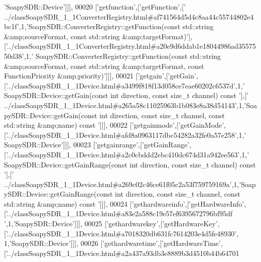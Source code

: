 \begin{DoxyCode}
{      'SoapySDR::Device'}]]],
00020   [\textcolor{stringliteral}{'getfunction'},[\textcolor{stringliteral}{'getFunction'},[\textcolor{stringliteral}{'
      ../classSoapySDR\_1\_1ConverterRegistry.html#af741564d5d4c8aa44c55744802e4bc1f'},1,\textcolor{stringliteral}{'SoapySDR::ConverterRegistry::getFunction(const std::string &amp;sourceFormat, const std::string
       &amp;targetFormat)'}],[\textcolor{stringliteral}{'../classSoapySDR\_1\_1ConverterRegistry.html#a20e9d6ddab1e18044986ad3557550d38'},1,\textcolor{stringliteral}{'
      SoapySDR::ConverterRegistry::getFunction(const std::string &amp;sourceFormat, const std::string &amp;targetFormat,
       const FunctionPriority &amp;priority)'}]]],
00021   [\textcolor{stringliteral}{'getgain'},[\textcolor{stringliteral}{'getGain'},[\textcolor{stringliteral}{'../classSoapySDR\_1\_1Device.html#a3499f818f13d058ce7eae60202c6537d'},1,\textcolor{stringliteral}{'
      SoapySDR::Device::getGain(const int direction, const size\_t channel) const '}],[\textcolor{stringliteral}{'
      ../classSoapySDR\_1\_1Device.html#a265a58c11025963b1b083e8a38d54143'},1,\textcolor{stringliteral}{'SoapySDR::Device::getGain(const int direction, const size\_t channel, const
       std::string &amp;name) const '}]]],
00022   [\textcolor{stringliteral}{'getgainmode'},[\textcolor{stringliteral}{'getGainMode'},[\textcolor{stringliteral}{'../classSoapySDR\_1\_1Device.html#afd8a0963117dbc54282a32fe0a57e258'},1,\textcolor{stringliteral}{'
      SoapySDR::Device'}]]],
00023   [\textcolor{stringliteral}{'getgainrange'},[\textcolor{stringliteral}{'getGainRange'},[\textcolor{stringliteral}{'../classSoapySDR\_1\_1Device.html#a2c0cbddd2ebc410dc674d31a942ee563'},1,\textcolor{stringliteral}{'
      SoapySDR::Device::getGainRange(const int direction, const size\_t channel) const '}],[\textcolor{stringliteral}{'
      ../classSoapySDR\_1\_1Device.html#a269c02c46ce61f05c2a53f759759169a'},1,\textcolor{stringliteral}{'SoapySDR::Device::getGainRange(const int direction, const
       size\_t channel, const std::string &amp;name) const '}]]],
00024   [\textcolor{stringliteral}{'gethardwareinfo'},[\textcolor{stringliteral}{'getHardwareInfo'},[\textcolor{stringliteral}{'../classSoapySDR\_1\_1Device.html#a83e2a588c19e57ef6395672796bf95df
      '},1,\textcolor{stringliteral}{'SoapySDR::Device'}]]],
00025   [\textcolor{stringliteral}{'gethardwarekey'},[\textcolor{stringliteral}{'getHardwareKey'},[\textcolor{stringliteral}{'../classSoapySDR\_1\_1Device.html#a7018320db631fc7614203e4d5fe48930'},
      1,\textcolor{stringliteral}{'SoapySDR::Device'}]]],
00026   [\textcolor{stringliteral}{'gethardwaretime'},[\textcolor{stringliteral}{'getHardwareTime'},[\textcolor{stringliteral}{'../classSoapySDR\_1\_1Device.html#a2a437a93db3e8889b3d4510b44b64701
}
\end{DoxyCode}
